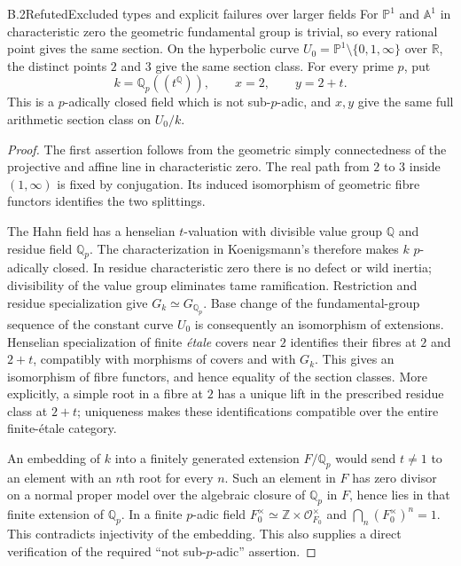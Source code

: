 \begin{statement}{B.2}{Refuted}{Excluded types and explicit failures over larger fields}
For $\mathbb P^1$ and $\mathbb A^1$ in characteristic zero the geometric
fundamental group is trivial, so every rational point gives the same
section.  On the hyperbolic curve
$U_0=\mathbb P^1\setminus\{0,1,\infty\}$ over $\mathbb R$, the distinct
points $2$ and $3$ give the same section class.  For every prime $p$, put
\[
 k=\mathbb Q_p((t^{\mathbb Q})),\qquad x=2,\qquad y=2+t.
\]
This is a $p$-adically closed field which is not sub-$p$-adic, and $x,y$
give the same full arithmetic section class on $U_0/k$.
\end{statement}
\begin{proof}
The first assertion follows from the geometric simply connectedness of
the projective and affine line in characteristic zero.  The real path
from $2$ to $3$ inside $(1,\infty)$ is fixed by conjugation.  Its induced
isomorphism of geometric fibre functors identifies the two splittings.

The Hahn field has a henselian $t$-valuation with divisible value group
$\mathbb Q$ and residue field $\mathbb Q_p$.  The characterization in
Koenigsmann's \cite[\S1, Fact on $p$-adically closed fields]{B_Koenigsmann}
therefore makes $k$ $p$-adically closed.  In residue characteristic zero
there is no defect or wild inertia; divisibility of the value group
eliminates tame ramification.  Restriction and residue specialization
give $G_k\simeq G_{\mathbb Q_p}$.
Base change of the fundamental-group sequence of the constant curve
$U_0$ is consequently an isomorphism of extensions.  Henselian
specialization of finite \emph{\'etale} covers near $2$ identifies their
fibres at $2$ and $2+t$, compatibly with morphisms of covers and with
$G_k$.  This gives an isomorphism of fibre functors, and hence equality
of the section classes.  More explicitly, a simple root in a fibre at
$2$ has a unique lift in the prescribed residue class at $2+t$;
uniqueness makes these identifications compatible over the entire
finite-\'etale category.

An embedding of $k$ into a finitely generated extension $F/\mathbb Q_p$
would send $t\ne1$ to an element with an $n$th root for every $n$.
Such an element in $F$ has zero divisor on a normal proper model over
the algebraic closure of $\mathbb Q_p$ in $F$, hence lies in that finite
extension of $\mathbb Q_p$.  In a finite $p$-adic field
$F_0^\times\simeq\mathbb Z\times\mathcal O_{F_0}^\times$ and
$\bigcap_n(F_0^\times)^n=1$.  This contradicts injectivity of the
embedding.  This also supplies a direct verification of the required
``not sub-$p$-adic'' assertion.
\end{proof}

